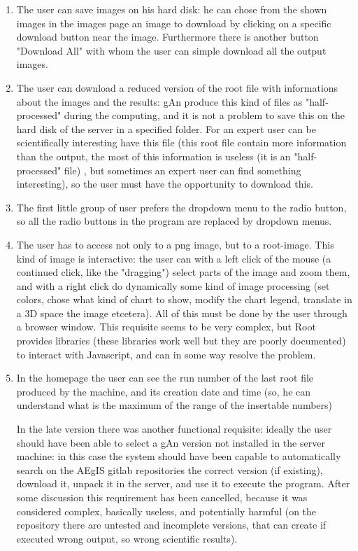 \begin{enumerate}
\item The user can save images on his hard disk: he can chose from the shown images in the images page an image to download by clicking on a specific download button near the image. Furthermore there is another button "Download All" with whom the user can simple download all the output images.

\item The user can download a reduced version of the root file with informations about the images and the results: gAn produce this kind of files as "half-processed" during the computing, and it is not a problem to save this on the hard disk of the server in a specified folder. For an expert user can be scientifically interesting have this file (this root file contain more information than the output, the most of this information is useless (it is an "half-processed" file) , but sometimes an expert user can find something interesting), so the user must have the opportunity to download this.     

\item The first little group of user prefers the dropdown menu to the radio button, so all the radio buttons in the program are replaced by dropdown menus.

\item The user has to access not only to a png image, but to a root-image. This kind of image is interactive: the user can with a left click of the mouse (a continued click, like the "dragging") select parts of the image and zoom them, and with a right click do dynamically some kind of image processing (set colors, chose  what kind of chart to show, modify the chart legend, translate in a 3D space the image etcetera). All of this must be done by the user through a browser window.  This requisite seems to be very complex, but Root provides libraries (these libraries work well but they are poorly documented) to interact with Javascript, and can in some way resolve the problem.  

\item In the homepage the user can see the run number of the last root file produced by the machine, and its creation date and time (so, he can understand what is the maximum of the range of the insertable numbers) 

In the late version there was another functional requisite: ideally the user should have been able to select a gAn version not installed in the server machine: in this case the system should have been capable to automatically  search on the AEgIS gitlab repositories the correct version (if existing), download it, unpack it in the server, and use it to execute the program. After some discussion this requirement has been cancelled, because it was considered complex, basically useless, and potentially harmful (on the repository there are untested and incomplete versions, that can create if executed wrong output, so wrong scientific results).

\end{enumerate}

